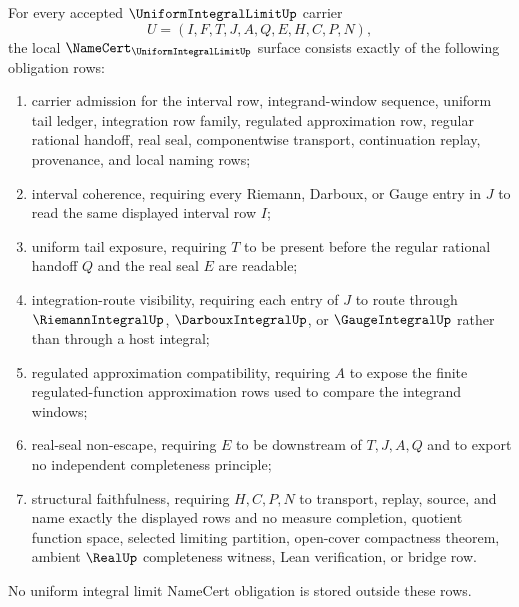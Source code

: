 \begin{theorem}
\label{thm:uniform-integral-limit-namecert-obligations}
For every accepted $\UniformIntegralLimitUp$ carrier
$$
U=(I,F,T,J,A,Q,E,H,C,P,N),
$$
the local $\NameCert_{\UniformIntegralLimitUp}$ surface consists exactly of the following obligation rows:
\begin{enumerate}
\item carrier admission for the interval row, integrand-window sequence, uniform tail ledger, integration row family, regulated approximation row, regular rational handoff, real seal, componentwise transport, continuation replay, provenance, and local naming rows;
\item interval coherence, requiring every Riemann, Darboux, or Gauge entry in $J$ to read the same displayed interval row $I$;
\item uniform tail exposure, requiring $T$ to be present before the regular rational handoff $Q$ and the real seal $E$ are readable;
\item integration-route visibility, requiring each entry of $J$ to route through $\RiemannIntegralUp$, $\DarbouxIntegralUp$, or $\GaugeIntegralUp$ rather than through a host integral;
\item regulated approximation compatibility, requiring $A$ to expose the finite regulated-function approximation rows used to compare the integrand windows;
\item real-seal non-escape, requiring $E$ to be downstream of $T,J,A,Q$ and to export no independent completeness principle;
\item structural faithfulness, requiring $H,C,P,N$ to transport, replay, source, and name exactly the displayed rows and no measure completion, quotient function space, selected limiting partition, open-cover compactness theorem, ambient $\RealUp$ completeness witness, Lean verification, or bridge row.
\end{enumerate}
No uniform integral limit NameCert obligation is stored outside these rows.
\end{theorem}
